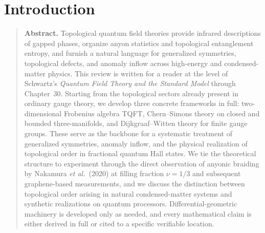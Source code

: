 %
%
%
%
%

\chapter{Introduction}\label{ch:introduction}

\begin{quote}
\textbf{Abstract.}
Topological quantum field theories provide infrared descriptions of gapped phases,
organize anyon statistics and topological entanglement entropy, and furnish a natural
language for generalized symmetries, topological defects, and anomaly inflow across
high-energy and condensed-matter physics.
%
This review is written for a reader at the level of Schwartz's
\emph{Quantum Field Theory and the Standard Model} through Chapter~30.
%
Starting from the topological sectors already present in ordinary gauge theory, we
develop three concrete frameworks in full: two-dimensional Frobenius algebra TQFT,
Chern--Simons theory on closed and bounded three-manifolds, and Dijkgraaf--Witten
theory for finite gauge groups.  These serve as the backbone for a systematic
treatment of generalized symmetries, anomaly inflow, and the physical realization of
topological order in fractional quantum Hall states.
%
We tie the theoretical structure to experiment through the direct observation of
anyonic braiding by Nakamura \emph{et al.}\ (2020) at filling fraction $\nu = 1/3$
and subsequent graphene-based measurements, and we discuss the distinction between
topological order arising in natural condensed-matter systems and synthetic
realizations on quantum processors.
%
Differential-geometric machinery is developed only as needed, and every mathematical
claim is either derived in full or cited to a specific verifiable location.
\end{quote}

